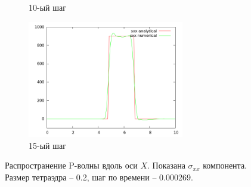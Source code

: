 \begin{figure}[H]
\begin{subfigure}[b]{0.5\textwidth}
\caption{10-ый шаг}
\end{subfigure}
\begin{subfigure}[b]{0.5\textwidth}
\centering
\includegraphics[width=0.75\textwidth]{png/veryfication/0.2/p-wave-along-x15.png}
\caption{15-ый шаг}
\end{subfigure}
\caption{Распространение P-волны вдоль оси $X$. Показана $\sigma_{xx}$ компонента. Размер тетраэдра -- 0.2, шаг по времени -- 0.000269. }
\label{pic:p_wave_along_x2}
\end{figure}

